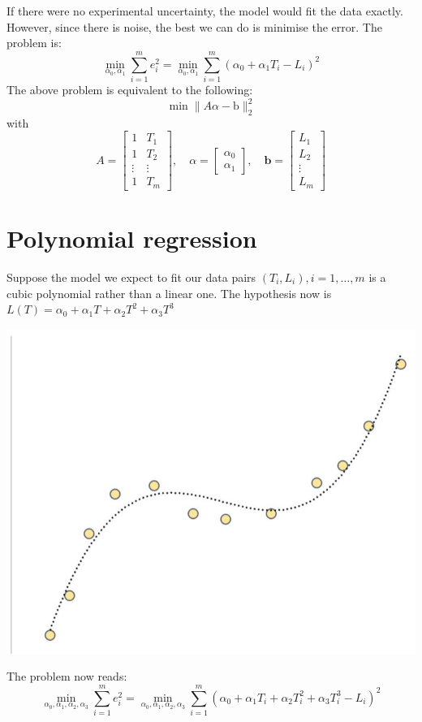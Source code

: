 \documentclass[11pt]{book}
\begin{document}
If there were no experimental uncertainty, the model would fit the data exactly. However, since there is noise, the best we can do is minimise the error. The problem is:
$$
\min _{\alpha_{0}, \alpha_{1}} \sum_{i=1}^{m} e_{i}^{2}=\min _{\alpha_{0}, \alpha_{1}} \sum_{i=1}^{m}\left(\alpha_{0}+\alpha_{1} T_{i}-L_{i}\right)^{2}
$$
The above problem is equivalent to the following:
$$
\min \|A \alpha-\mathrm{b}\|_{2}^{2}
$$
with
$$
A=\left[\begin{array}{cc}
1 & T_{1} \\
1 & T_{2} \\
\vdots & \vdots \\
1 & T_{m}
\end{array}\right], \quad \alpha=\left[\begin{array}{c}
\alpha_{0} \\
\alpha_{1}
\end{array}\right], \quad \mathbf{b}=\left[\begin{array}{c}
L_{1} \\
L_{2} \\
\vdots \\
L_{m}
\end{array}\right]
$$

\section*{Polynomial regression}
Suppose the model we expect to fit our data pairs $\left(T_{i}, L_{i}\right), i=1, \ldots, m$ is a cubic polynomial rather than a linear one. The hypothesis now is
$L(T)=\alpha_{0}+\alpha_{1} T+\alpha_{2} T^{2}+\alpha_{3} T^{3}$
\begin{center}
\includegraphics[scale = 0.2]{2023_09_05_b72ccc85584d9dc6fb5cg-304}
\end{center}
The problem now reads:
$$
\min _{\alpha_{0}, \alpha_{1}, \alpha_{2}, \alpha_{3}} \sum_{i=1}^{m} e_{i}^{2}=\min _{\alpha_{0}, \alpha_{1}, \alpha_{2}, \alpha_{3}} \sum_{i=1}^{m}\left(\alpha_{0}+\alpha_{1} T_{i}+\alpha_{2} T_{i}^{2}+\alpha_{3} T_{i}^{3}-L_{i}\right)^{2}
$$
\end{document}
